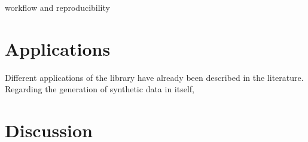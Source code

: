 \documentclass[11pt]{article}
\begin{document}
\cite{reuillon2019fostering}
\cite{reuillon2013openmole}
\cite{passerat2017reproducible} workflow and reproducibility


\section{Applications}

Different applications of the library have already been described in the literature. Regarding the generation of synthetic data in itself, 



\section{Discussion}






\end{document}

